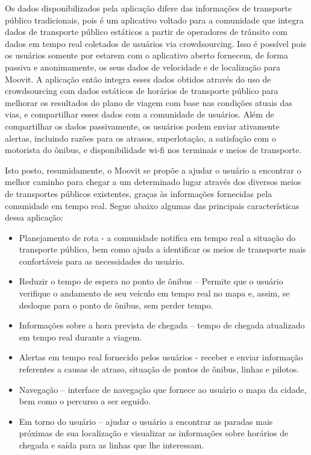 Os dados disponibilizados pela aplicação difere das informações de transporte público tradicionais, pois é um aplicativo voltado para a comunidade que integra dados de transporte público estáticos a partir de operadores de trânsito com dados em tempo real coletados de usuários via crowdsourcing. Isso é possível pois os usuários somente por estarem com o aplicativo aberto fornecem, de forma passiva e anonimamente, os seus dados de velocidade e de localização para Moovit. A aplicação então integra esses dados obtidos através do uso de crowdsourcing com dados estáticos de horários de transporte público para melhorar os resultados do plano de viagem com base nas condições atuais das vias, e compartilhar esses dados com a comunidade de usuários. Além de compartilhar os dados passivamente, os usuários podem enviar ativamente alertas, incluindo razões para os atrasos, superlotação, a satisfação com o motorista do ônibus, e disponibilidade wi-fi nos terminais e meios de transporte.
	
Isto posto, resumidamente, o Moovit se propõe a ajudar o usuário a encontrar o melhor caminho para chegar a um determinado lugar através dos diversos meios de transportes públicos existentes, graças às informações fornecidas pela comunidade em tempo real. Segue abaixo algumas das principais características dessa aplicação: 

\begin{itemize}
\item Planejamento de rota - a comunidade notifica em tempo real a situação do transporte público,  bem como ajuda a identificar os meios de transporte  mais confortáveis para as necessidades do usuário. 
\item Reduzir o tempo de espera no ponto de ônibus – Permite que o usuário verifique o andamento de seu veículo em tempo real no mapa e, assim,  se desloque  para o ponto de ônibus, sem perder tempo. 
\item Informações sobre a hora prevista de chegada – tempo de chegada atualizado em tempo real durante a viagem. 
\item Alertas em tempo real fornecido pelos usuários - receber e enviar informação referentes a causas de atraso, situação de pontos de ônibus, linhas e pilotos. 
\item Navegação – interface de navegação que fornece ao usuário o mapa da cidade, bem como o  percurso a ser seguido. 
\item Em torno do usuário – ajudar o usuário a encontrar as paradas mais próximas de sua localização e visualizar as informações sobre horários de chegada e saída para as linhas que lhe interessam.
\end{itemize}

